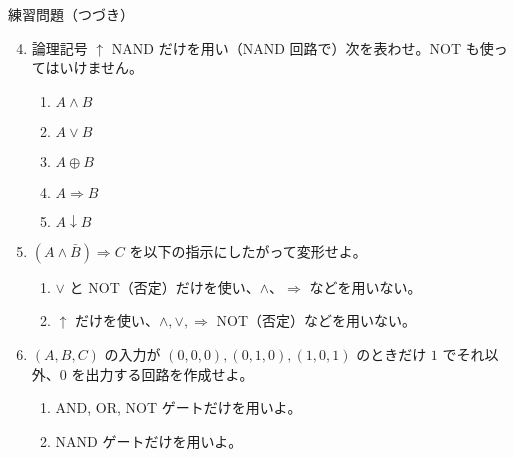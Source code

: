 \documentclass[10pt, dvipdfmx]{beamer}
\begin{document}
\begin{frame}{練習問題（つづき）}
\begin{enumerate}
\setcounter{enumi}{3}

\item 論理記号 $\uparrow$ NAND だけを用い（NAND 回路で）次を表わせ。NOT も使ってはいけません。
\begin{enumerate}
\item $A \land B$
\item $A \lor B$
\item $A \oplus B$
\item $A \Rightarrow B$
\item $A \downarrow B$
\end{enumerate}

\item $(A\land \bar{B}) \Rightarrow C$ を以下の指示にしたがって変形せよ。
\begin{enumerate}
\item $\lor$ と NOT（否定）だけを使い、$\land$、$\Rightarrow$ などを用いない。
\item $\uparrow$ だけを使い、$\land, \lor, \Rightarrow$ NOT（否定）などを用いない。
\end{enumerate}

\item $(A, B, C)$ の入力が $(0,0,0), (0,1,0), (1,0,1)$ のときだけ $1$ でそれ以外、$0$ を出力する回路を作成せよ。

\begin{enumerate}
\item  AND, OR, NOT ゲートだけを用いよ。
\item  NAND ゲートだけを用いよ。
\end{enumerate}
\end{enumerate}

\end{frame}
\end{document}
